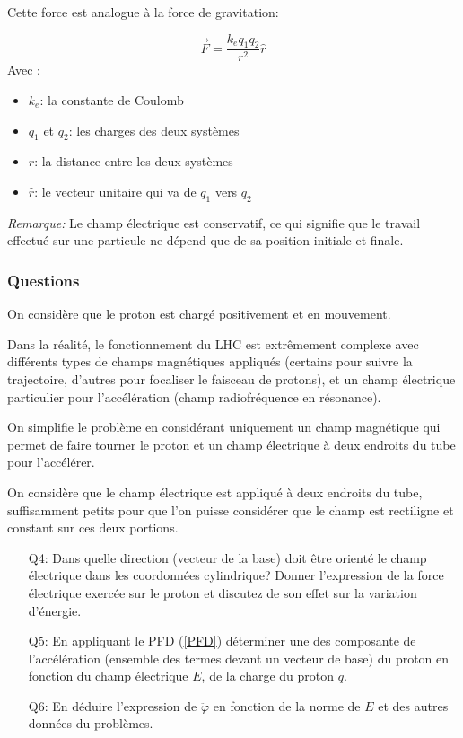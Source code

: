 \documentclass[14pt]{article}
\begin{document}
Cette force est analogue à la force de gravitation:

\begin{equation} \label{eq:1.2.2}
    \vec{F} = \frac{k_e q_1 q_2}{r^2} \hat{r}
    \tag{1.2.2}
\end{equation}
Avec :
\begin{itemize}
    \item $k_e$: la constante de Coulomb
    \item $q_1$ et $q_2$: les charges des deux systèmes
    \item $r$: la distance entre les deux systèmes
    \item $\hat{r}$: le vecteur unitaire qui va de $q_1$ vers $q_2$
\end{itemize}

\textit{Remarque:} Le champ électrique est conservatif, ce qui signifie que le travail effectué sur une particule ne dépend que de sa position initiale et finale.

\subsubsection{Questions}\label{q:champE}
On considère que le proton est chargé positivement et en mouvement.

Dans la réalité, le fonctionnement du LHC est extrêmement complexe avec différents types de champs magnétiques appliqués (certains pour suivre la trajectoire, d'autres pour focaliser le faisceau de protons), et un champ électrique particulier pour l'accélération (champ radiofréquence en résonance).

On simplifie le problème en considérant uniquement un champ magnétique qui permet de faire tourner le proton et un champ électrique à deux endroits du tube pour l'accélérer.


On considère que le champ électrique est appliqué à deux endroits du tube, suffisamment petits pour que l'on puisse considérer que le champ est rectiligne et constant sur ces deux portions.

\begin{enumerate}
    \item[Q4:] Dans quelle direction (vecteur de la base) doit être orienté le champ électrique dans les coordonnées cylindrique? Donner l'expression de la force électrique exercée sur le proton et discutez de son effet sur la variation d'énergie.
    \item[Q5:] En appliquant le PFD (\ref{PFD}) déterminer une des composante de l'accélération (ensemble des termes devant un vecteur de base) du proton en fonction du champ électrique $E$, de la charge du proton $q$. 
    \item[Q6:] En déduire l'expression de $\ddot{\varphi}$ en fonction de la norme de $E$ et des autres données du problèmes.
\end{enumerate}
\end{document}
